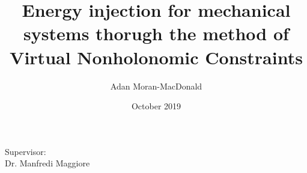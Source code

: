 \title{Energy injection for mechanical systems thorugh the method of Virtual Nonholonomic Constraints}
\author{Adan Moran-MacDonald }
\date{October 2019}

\begin{titlepage}
    \maketitle

    \thispagestyle{empty}
    
    \begin{center}
        Supervisor: \\
        Dr. Manfredi Maggiore\\
    \end{center}
\end{titlepage}